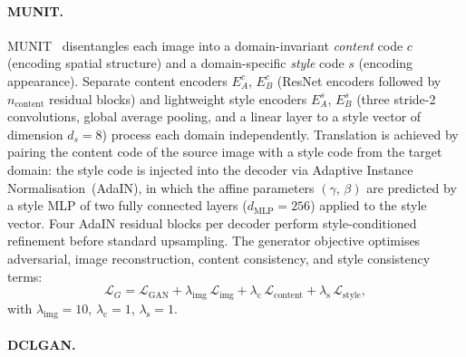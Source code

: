 \paragraph{MUNIT.}
\label{sec:supp-munit}

MUNIT~\cite{huang2018multimodal} disentangles each image into a domain-invariant
\textit{content} code $c$ (encoding spatial structure) and a domain-specific
\textit{style} code $s$ (encoding appearance).
Separate content encoders $E^c_A$, $E^c_B$ (ResNet encoders followed by $n_{\text{content}}$
residual blocks) and lightweight style encoders $E^s_A$, $E^s_B$ (three stride-2
convolutions, global average pooling, and a linear layer to a style vector of
dimension $d_s{=}8$) process each domain independently.
Translation is achieved by pairing the content code of the source image with a style
code from the target domain: the style code is injected into the decoder via Adaptive
Instance Normalisation~(AdaIN), in which the affine parameters
$(\gamma,\,\beta)$ are predicted by a style MLP of two fully connected layers
($d_{\text{MLP}}{=}256$) applied to the style vector.
Four AdaIN residual blocks per decoder perform style-conditioned refinement before
standard upsampling.
The generator objective optimises adversarial, image reconstruction, content
consistency, and style consistency terms:
\begin{equation}
  \mathcal{L}_G = \mathcal{L}_{\text{GAN}} +
    \lambda_{\text{img}}\,\mathcal{L}_{\text{img}} +
    \lambda_{\text{c}}\,\mathcal{L}_{\text{content}} +
    \lambda_{\text{s}}\,\mathcal{L}_{\text{style}},
\end{equation}
with $\lambda_{\text{img}}{=}10$, $\lambda_{\text{c}}{=}1$, $\lambda_{\text{s}}{=}1$.

\paragraph{DCLGAN.}
\label{sec:supp-dclgan}

